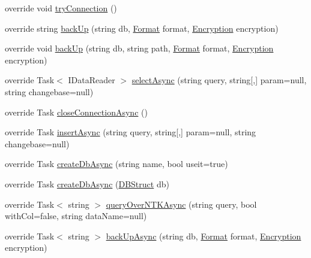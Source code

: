 \begin{DoxyCompactItemize}
override void \mbox{\hyperlink{class_n_t_k_1_1_database_1_1_n_t_k_d___my_sql_ab59d2accc411ac28b4b285241d3f91f8}{try\+Connection}} ()
\item 
override string \mbox{\hyperlink{class_n_t_k_1_1_database_1_1_n_t_k_d___my_sql_a88e3c9a7419410607cd95b4c66bc311c}{back\+Up}} (string db, \mbox{\hyperlink{namespace_n_t_k_1_1_database_a9bed700210ca4ed5854002637b664789}{Format}} format, \mbox{\hyperlink{namespace_n_t_k_1_1_database_aa21afe93187a6c77c4ccdc988b3c4ac2}{Encryption}} encryption)
\item 
override void \mbox{\hyperlink{class_n_t_k_1_1_database_1_1_n_t_k_d___my_sql_a4c736fdb3e69e67e165ec0686129fd42}{back\+Up}} (string db, string path, \mbox{\hyperlink{namespace_n_t_k_1_1_database_a9bed700210ca4ed5854002637b664789}{Format}} format, \mbox{\hyperlink{namespace_n_t_k_1_1_database_aa21afe93187a6c77c4ccdc988b3c4ac2}{Encryption}} encryption)
\item 
override Task$<$ I\+Data\+Reader $>$ \mbox{\hyperlink{class_n_t_k_1_1_database_1_1_n_t_k_d___my_sql_ae9f789100eb6cafdc0173f2b42cab17e}{select\+Async}} (string query, string\mbox{[},\mbox{]} param=null, string changebase=null)
\item 
override Task \mbox{\hyperlink{class_n_t_k_1_1_database_1_1_n_t_k_d___my_sql_af3c165d5298437959df53c53ecf75c12}{close\+Connection\+Async}} ()
\item 
override Task \mbox{\hyperlink{class_n_t_k_1_1_database_1_1_n_t_k_d___my_sql_a3322f64b08d90c975e47bedc016d083b}{insert\+Async}} (string query, string\mbox{[},\mbox{]} param=null, string changebase=null)
\item 
override Task \mbox{\hyperlink{class_n_t_k_1_1_database_1_1_n_t_k_d___my_sql_ac23605ee26166e84d5076ed5e62efa64}{create\+Db\+Async}} (string name, bool useit=true)
\item 
override Task \mbox{\hyperlink{class_n_t_k_1_1_database_1_1_n_t_k_d___my_sql_a8ee9b577cc33af66b782afd838d24469}{create\+Db\+Async}} (\mbox{\hyperlink{class_n_t_k_1_1_database_1_1_d_b_struct}{D\+B\+Struct}} db)
\item 
override Task$<$ string $>$ \mbox{\hyperlink{class_n_t_k_1_1_database_1_1_n_t_k_d___my_sql_a014ba00130d44bdfee7a5362180669c0}{query\+Over\+N\+T\+K\+Async}} (string query, bool with\+Col=false, string data\+Name=null)
\item 
override Task$<$ string $>$ \mbox{\hyperlink{class_n_t_k_1_1_database_1_1_n_t_k_d___my_sql_a4d2ed0e55c01418fefaad5378204a4d7}{back\+Up\+Async}} (string db, \mbox{\hyperlink{namespace_n_t_k_1_1_database_a9bed700210ca4ed5854002637b664789}{Format}} format, \mbox{\hyperlink{namespace_n_t_k_1_1_database_aa21afe93187a6c77c4ccdc988b3c4ac2}{Encryption}} encryption)

\end{DoxyCompactItemize}
